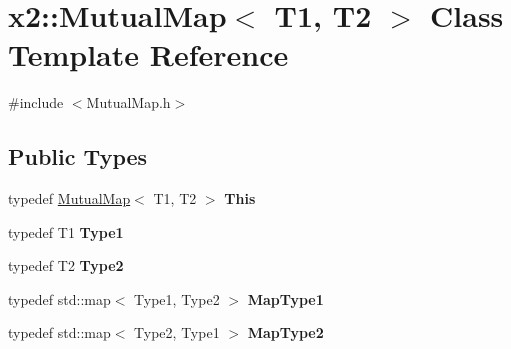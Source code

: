 \hypertarget{classx2_1_1_mutual_map}{}\section{x2\+:\+:Mutual\+Map$<$ T1, T2 $>$ Class Template Reference}
\label{classx2_1_1_mutual_map}


{\ttfamily \#include $<$Mutual\+Map.\+h$>$}

\subsection*{Public Types}
\begin{DoxyCompactItemize}
\item 
\mbox{\label{classx2_1_1_mutual_map_aab4506822de38fe4801e6fd26dcfc4a8}} 
typedef \hyperlink{classx2_1_1_mutual_map}{Mutual\+Map}$<$ T1, T2 $>$ {\bfseries This}
\item 
\mbox{\label{classx2_1_1_mutual_map_a5b2d1fecd17aa67effd5f530f3bfcb77}} 
typedef T1 {\bfseries Type1}
\item 
\mbox{\label{classx2_1_1_mutual_map_afa9a6a304444f00fc24e2a643731ec6e}} 
typedef T2 {\bfseries Type2}
\item 
\mbox{\label{classx2_1_1_mutual_map_a2b67e110065e0e79fb558e662980d6ba}} 
typedef std\+::map$<$ Type1, Type2 $>$ {\bfseries Map\+Type1}
\item 
\mbox{\label{classx2_1_1_mutual_map_a3d131315a967f500f9273ee5b41e9e72}} 
typedef std\+::map$<$ Type2, Type1 $>$ {\bfseries Map\+Type2}
\end{DoxyCompactItemize}
